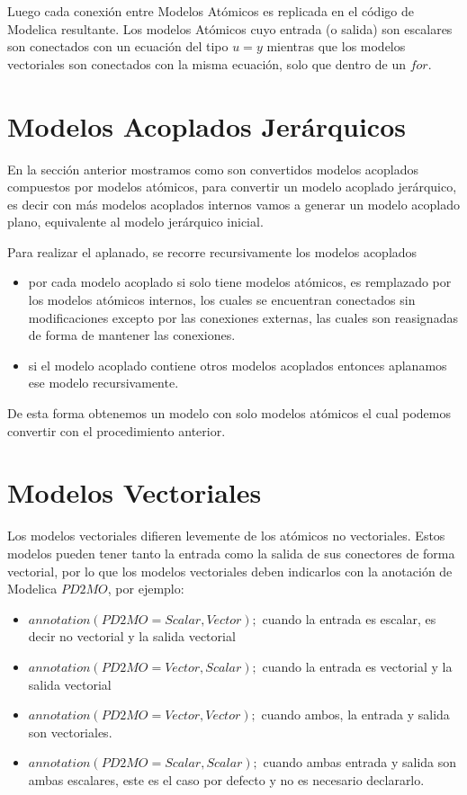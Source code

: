 \documentclass[a4paper,	11pt]{report}
\begin{document}
Luego cada conexión entre Modelos Atómicos es replicada en el código de Modelica resultante. Los modelos Atómicos cuyo entrada (o salida) son escalares son conectados con un ecuación del tipo $u = y$ mientras que los modelos vectoriales son conectados con la misma ecuación, solo que dentro de un $for$.

\section{Modelos Acoplados Jerárquicos}

En la sección anterior mostramos como son convertidos modelos acoplados compuestos por modelos atómicos, para convertir un modelo acoplado jerárquico, es decir con más modelos acoplados internos vamos a generar un modelo acoplado plano, equivalente al modelo jerárquico inicial.

Para realizar el aplanado, se recorre recursivamente los modelos acoplados

\begin{itemize}
\item por cada modelo acoplado si solo tiene modelos atómicos, es remplazado por los modelos atómicos internos, los cuales se encuentran conectados sin modificaciones excepto por las conexiones externas, las cuales son reasignadas de forma de mantener las conexiones.
\item si el modelo acoplado contiene otros modelos acoplados entonces aplanamos ese modelo recursivamente.
\end{itemize} 

De esta forma obtenemos un modelo con solo modelos atómicos el cual podemos convertir con el procedimiento anterior.

\section{Modelos Vectoriales}
Los modelos vectoriales difieren levemente de los atómicos no vectoriales. Estos modelos pueden tener tanto la entrada como la salida de sus conectores de forma vectorial, por lo que los modelos vectoriales deben indicarlos con la anotación de Modelica $PD2MO$, por ejemplo:
\begin{itemize}
\item $annotation(PD2MO = {Scalar, Vector});$ cuando la entrada es escalar, es decir no vectorial y la salida vectorial
\item $annotation(PD2MO = {Vector, Scalar});$ cuando la entrada es vectorial y la salida vectorial
\item $annotation(PD2MO = {Vector, Vector});$ cuando ambos, la entrada y salida son vectoriales.
\item $annotation(PD2MO = {Scalar, Scalar});$ cuando ambas entrada y salida son ambas escalares, este es el caso por defecto y no es necesario declararlo.
\end{itemize}
\end{document}
